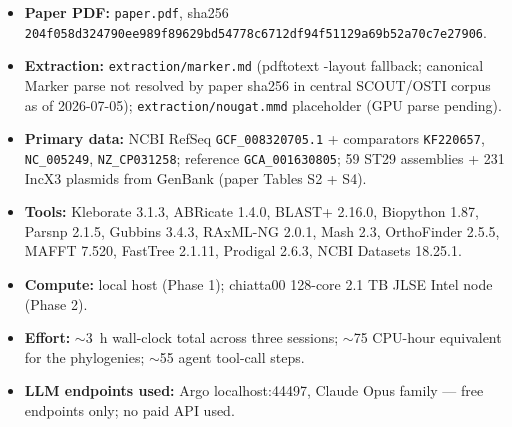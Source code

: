 \documentclass[11pt,letterpaper]{article}
\begin{document}
\begin{itemize}[nosep]
\item \textbf{Paper PDF:} \texttt{paper.pdf}, sha256 \texttt{204f058d324790ee989f89629bd54778c6712df94f51129a69b52a70c7e27906}.
\item \textbf{Extraction:} \texttt{extraction/marker.md} (pdftotext -layout fallback; canonical Marker parse not resolved by paper sha256 in central SCOUT/OSTI corpus as of 2026-07-05); \texttt{extraction/nougat.mmd} placeholder (GPU parse pending).
\item \textbf{Primary data:} NCBI RefSeq \texttt{GCF\_008320705.1} + comparators \texttt{KF220657}, \texttt{NC\_005249}, \texttt{NZ\_CP031258}; reference \texttt{GCA\_001630805}; 59 ST29 assemblies + 231 IncX3 plasmids from GenBank (paper Tables S2 + S4).
\item \textbf{Tools:} Kleborate 3.1.3, ABRicate 1.4.0, BLAST+ 2.16.0, Biopython 1.87, Parsnp 2.1.5, Gubbins 3.4.3, RAxML-NG 2.0.1, Mash 2.3, OrthoFinder 2.5.5, MAFFT 7.520, FastTree 2.1.11, Prodigal 2.6.3, NCBI Datasets 18.25.1.
\item \textbf{Compute:} local host (Phase 1); chiatta00 128-core 2.1 TB JLSE Intel node (Phase 2).
\item \textbf{Effort:} $\sim$3~h wall-clock total across three sessions; $\sim$75 CPU-hour equivalent for the phylogenies; $\sim$55 agent tool-call steps.
\item \textbf{LLM endpoints used:} Argo localhost:44497, Claude Opus family --- free endpoints only; no paid API used.
\end{itemize}
\end{document}
